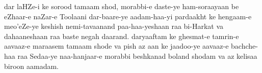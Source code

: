 \documentclass{article}
\begin{document}
dar laHZe-i ke sorood tamaam shod, morabbi-e daste-ye ham-soraayaan be
eZhaar-e naZar-e Toolaani dar-baare-ye aadam-haa-yi pardaakht ke hengaam-e
meo'eZe-ye keshish nemi-tavaanand paa-haa-yeshaan raa bi-Harkat va
dahaaneshaan raa baste negah daarand.  daryaaftam ke ghesmat-e tamrin-e
aavaaz-e maraasem tamaam shode va pish az aan ke jaadoo-ye aavaaz-e
bachche-haa raa Sedaa-ye naa-hanjaar-e morabbi beshkanad boland shodam va az
kelisaa biroon aamadam.

\bigskip{}
\end{document}
